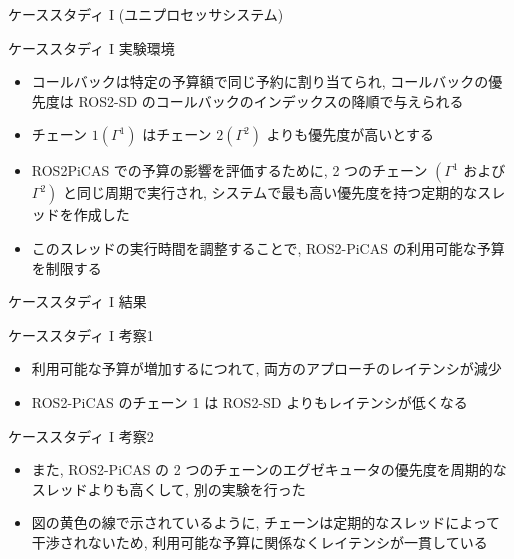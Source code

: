 \begin{frame}{ケーススタディ I (ユニプロセッサシステム)}
\end{frame}

\begin{frame}{ケーススタディ I 実験環境}
    \begin{itemize}
        \item コールバックは特定の予算額で同じ予約に割り当てられ, コールバックの優先度は ROS2-SD のコールバックのインデックスの降順で与えられる
        \item チェーン $1\left(\Gamma^{1}\right)$ はチェーン $2\left(\Gamma^{2}\right)$ よりも優先度が高いとする
        \item ROS2PiCAS での予算の影響を評価するために, 2 つのチェーン $\left(\Gamma^{1}\right.$ および $\left.\Gamma^{2}\right)$ と同じ周期で実行され, システムで最も高い優先度を持つ定期的なスレッドを作成した
        \item このスレッドの実行時間を調整することで, ROS2-PiCAS の利用可能な予算を制限する
    \end{itemize}
\end{frame}

\begin{frame}{ケーススタディ I 結果}
\end{frame}

\begin{frame}{ケーススタディ I 考察1}
    \begin{itemize}
        \item 利用可能な予算が増加するにつれて, 両方のアプローチのレイテンシが減少
        \item ROS2-PiCAS のチェーン 1 は ROS2-SD よりもレイテンシが低くなる
    \end{itemize}
\end{frame}

\begin{frame}{ケーススタディ I 考察2}
    \begin{itemize}
        \item また, ROS2-PiCAS の 2 つのチェーンのエグゼキュータの優先度を周期的なスレッドよりも高くして, 別の実験を行った
        \item 図の黄色の線で示されているように, チェーンは定期的なスレッドによって干渉されないため, 利用可能な予算に関係なくレイテンシが一貫している
    \end{itemize}
\end{frame}

